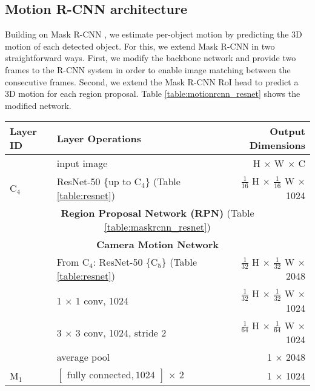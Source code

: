 
\subsection{Motion R-CNN architecture}
\label{ssec:architecture}

Building on Mask R-CNN \cite{MaskRCNN},
we estimate per-object motion by predicting the 3D motion of each detected object.
For this, we extend Mask R-CNN in two straightforward ways.
First, we modify the backbone network and provide two frames to the R-CNN system
in order to enable image matching between the consecutive frames.
Second, we extend the Mask R-CNN RoI head to predict a 3D motion for each
region proposal. Table \ref{table:motionrcnn_resnet} shows the modified network.

{
\begin{table}[h]
\centering
\begin{tabular}{llr}
\toprule
\textbf{Layer ID} & \textbf{Layer Operations} & \textbf{Output Dimensions} \\
\midrule\midrule
& input image & H $\times$ W $\times$ C \\
\midrule
C$_4$ & ResNet-50 \{up to C$_4$\} (Table \ref{table:resnet}) & $\tfrac{1}{16}$ H $\times$ $\tfrac{1}{16}$ W $\times$ 1024 \\
\midrule
\multicolumn{3}{c}{\textbf{Region Proposal Network (RPN)} (Table \ref{table:maskrcnn_resnet})}\\
\midrule
\multicolumn{3}{c}{\textbf{Camera Motion Network}}\\
\midrule
& From C$_4$: ResNet-50 \{C$_5$\} (Table \ref{table:resnet}) & $\tfrac{1}{32}$ H $\times$ $\tfrac{1}{32}$ W $\times$ 2048 \\
& 1 $\times$ 1 conv, 1024 & $\tfrac{1}{32}$ H $\times$ $\tfrac{1}{32}$ W $\times$ 1024 \\
& 3 $\times$ 3 conv, 1024, stride 2 & $\tfrac{1}{64}$ H $\times$ $\tfrac{1}{64}$ W $\times$ 1024 \\
& average pool & 1 $\times$ 2048 \\
M$_1$ & $\begin{bmatrix}\textrm{fully connected}, 1024\end{bmatrix}$ $\times$ 2  & 1 $\times$ 1024 \\


\end{tabular}
\end{table}}
